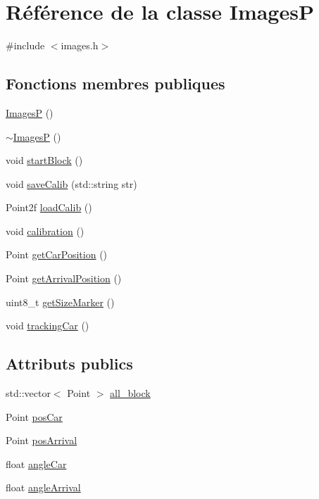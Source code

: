 \hypertarget{classImagesP}{\section{Référence de la classe Images\-P}
\label{classImagesP}
}


{\ttfamily \#include $<$images.\-h$>$}

\subsection*{Fonctions membres publiques}
\begin{DoxyCompactItemize}
\item 
\hyperlink{classImagesP_a18ff58308b1ba5787e1d05f0acd7224a}{Images\-P} ()
\item 
\hyperlink{classImagesP_abd4ea58f9cb814dbb27feb5d2d793e53}{$\sim$\-Images\-P} ()
\item 
void \hyperlink{classImagesP_ae2aecf8db20e7b3bcd14a7182dfdaf29}{start\-Block} ()
\item 
void \hyperlink{classImagesP_aeb7483dee60e755fffcc9e6f9355fd43}{save\-Calib} (std\-::string str)
\item 
Point2f \hyperlink{classImagesP_a4048e5f515cb51cbf25211ec8b4854b7}{load\-Calib} ()
\item 
void \hyperlink{classImagesP_a799c4550d96659d7d188b03f52bb9f4a}{calibration} ()
\item 
Point \hyperlink{classImagesP_afe9cff50f49fc67bd8938d8d0223fe81}{get\-Car\-Position} ()
\item 
Point \hyperlink{classImagesP_aaf0d33634f747f1defec833fbc6dfae2}{get\-Arrival\-Position} ()
\item 
uint8\-\_\-t \hyperlink{classImagesP_a002bb2f3148a85c46c954dcc98ad2760}{get\-Size\-Marker} ()
\item 
void \hyperlink{classImagesP_adf17333e9b35092e96fef60bbbf80d74}{tracking\-Car} ()
\end{DoxyCompactItemize}
\subsection*{Attributs publics}
\begin{DoxyCompactItemize}
\item 
std\-::vector$<$ Point $>$ \hyperlink{classImagesP_ab9e279526694a7ce421cfa11b9309ed1}{all\-\_\-block}
\item 
Point \hyperlink{classImagesP_a79d1d01bae703caeee1033425e4f8f18}{pos\-Car}
\item 
Point \hyperlink{classImagesP_a621b649c63d3967849103c03082af64c}{pos\-Arrival}
\item 
float \hyperlink{classImagesP_a39c69bdd9469b4b8a2c9666e27afa7b0}{angle\-Car}
\item 
float \hyperlink{classImagesP_a408c61aeceb9175481adb2daca707a48}{angle\-Arrival}
\end{DoxyCompactItemize}
